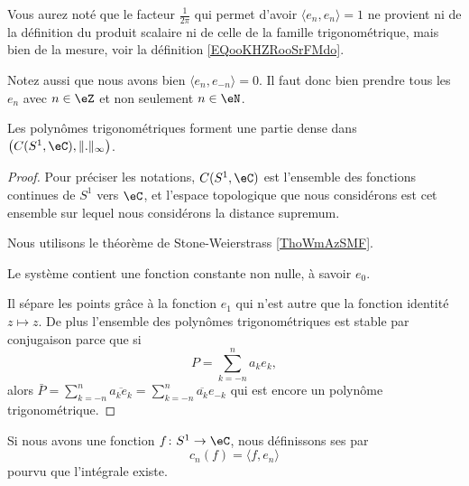 \begin{remark}
	Vous aurez noté que le facteur \( \frac{1}{ 2\pi }\) qui permet d'avoir \( \langle e_n, e_n\rangle=1 \) ne provient ni de la définition du produit scalaire ni de celle de la famille trigonométrique, mais bien de la mesure, voir la définition \ref{EQooKHZRooSrFMdo}.
\end{remark}

\begin{remark}      \label{REMooUCANooVyXPxj}
	Notez aussi que nous avons bien \( \langle e_n, e_{-n}\rangle =0\). Il faut donc bien prendre tous les \( e_n\) avec \( n\in \eZ\) et non seulement \( n\in \eN\).
\end{remark}

\begin{proposition}     \label{PROPooTGBHooXGhdPR}
	Les polynômes trigonométriques forment une partie dense dans \( \big( C(S^1,\eC),\| . \|_{\infty} \big)\).
\end{proposition}

\begin{proof}
	Pour préciser les notations, \( C(S^1,\eC)\) est l'ensemble des fonctions continues de \( S^1\) vers \( \eC\), et l'espace topologique que nous considérons est cet ensemble sur lequel nous considérons la distance supremum.

	Nous utilisons le théorème de Stone-Weierstrass \ref{ThoWmAzSMF}.

	Le système contient une fonction constante non nulle, à savoir \( e_0\).

	Il sépare les points grâce à la fonction \( e_1\) qui n'est autre que la fonction identité \( z\mapsto z\). De plus l'ensemble des polynômes trigonométriques est stable par conjugaison parce que si
	\begin{equation}
		P=\sum_{k=-n}^na_ke_k,
	\end{equation}
	alors \( \bar P=\sum_{k=-n}^n\overline{ a_k e_k}=\sum_{k=-n}^n\overline{ a_k }e_{-k}\) qui est encore un polynôme trigonométrique.
\end{proof}

\begin{definition}
	Si nous avons une fonction \( f\colon S^1\to \eC\), nous définissons ses  par
	\begin{equation}
		c_n(f)=\langle f, e_n\rangle
	\end{equation}
	pourvu que l'intégrale existe.
\end{definition}

